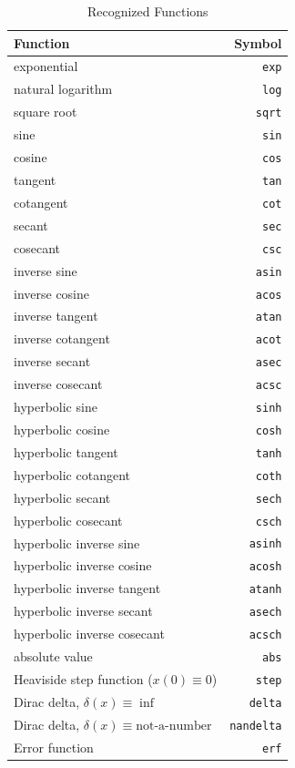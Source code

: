 \documentclass{article}
\begin{document}
\begin{table}
\begin{center}
\caption{Recognized Functions}
\label{tab:functions}
\vspace{1ex}
\begin{tabular}{l|r}
Function & Symbol \\
\hline
exponential & \texttt{exp}\\
natural logarithm & \texttt{log}\\
square root & \texttt{sqrt}\\
sine & \texttt{sin}\\
cosine & \texttt{cos}\\
tangent & \texttt{tan}\\
cotangent & \texttt{cot}\\
secant & \texttt{sec}\\
cosecant & \texttt{csc}\\
inverse sine & \texttt{asin}\\
inverse cosine & \texttt{acos}\\
inverse tangent & \texttt{atan}\\
inverse cotangent & \texttt{acot}\\
inverse secant & \texttt{asec}\\
inverse cosecant & \texttt{acsc}\\
hyperbolic sine & \texttt{sinh}\\
hyperbolic cosine & \texttt{cosh}\\
hyperbolic tangent & \texttt{tanh}\\
hyperbolic cotangent & \texttt{coth}\\
hyperbolic secant & \texttt{sech}\\
hyperbolic cosecant & \texttt{csch}\\
hyperbolic inverse sine & \texttt{asinh}\\
hyperbolic inverse cosine & \texttt{acosh}\\
hyperbolic inverse tangent & \texttt{atanh}\\
hyperbolic inverse secant & \texttt{asech}\\
hyperbolic inverse cosecant & \texttt{acsch}\\
absolute value & \texttt{abs}\\
Heaviside step function ($x\left(0\right) \equiv 0$) & \texttt{step}\\
Dirac delta, $\delta(x) \equiv \inf$ & \texttt{delta}\\
Dirac delta, $\delta(x) \equiv \text{not-a-number}$ & \texttt{nandelta}\\
Error function & \texttt{erf}
\end{tabular}
\end{center}
\end{table}
\end{document}
